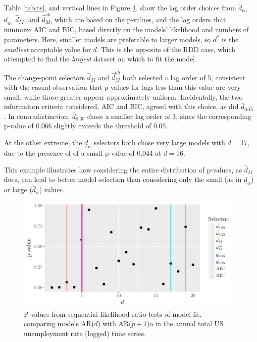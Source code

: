 \documentclass[12pt]{article}\usepackage[]{graphicx}\usepackage[]{color}
\makeatletter
\def\maxwidth{ %
  \ifdim\Gin@nat@width>\linewidth
    \linewidth
  \else
    \Gin@nat@width
  \fi
}
\newcommand{\dalphaU}{\bar{d}_\alpha}
\newcommand{\dalphaB}{\underline{d}_\alpha}
\newcommand{\dstar}{d^*}
\newcommand{\dhatU}{\bar{d}}
\newcommand{\dhatm}{\hat{d}_M}
\newcommand{\dhatmab}{\hat{d}^{ab}_M}
\makeatother
\begin{document}
Table \ref{tab:ts}, and vertical lines in Figure \ref{fig:tspvalues1},
show the lag order choices from $\dalphaU$, $\dalphaB$, $\dhatm$, and
$\dhatmab$, which are based on the p-values, and the lag orders that
minimize AIC and BIC, based directly on the models' likelihood and numbers
of parameters.
Here, smaller models are preferable to larger models, so $\dstar$ is
the \emph{smallest} acceptable value for $d$.
This is the opposite of the RDD case, which attempted to find the
\emph{largest} dataset on which to fit the model.






The change-point selectors $\dhatm$ and $\dhatmab$ both selected a
lag order of 5, consistent with the casual
observation that p-values for lags less than this value are very
small, while those greater appear approximately uniform.
Incidentally, the two information criteria considered, AIC and BIC,
agreed with this choice, as did $\dhatU_{0.15}$.
In contradistinction, $\dhatU_{0.05}$ chose a smaller lag order of
3, since the corresponding p-value of
0.066 slightly exceeds the threshold of 0.05.

At the other extreme, the $\dalphaB$ selectors both chose very large
models with $d=$17, due to the presence of
of a small p-value of
0.044 at
$d=$16.

This example illustrates how considering the entire distribution of
p-values, as $\dhatm$ does, can lead to better model selection than
considering only the small (as in $\dalphaB$) or large ($\dalphaU$)
values.

\begin{figure}

\includegraphics[width=\maxwidth]{figure/tsResults-1} 

\caption{P-values from sequential likelihood-ratio tests of model fit,
  comparing models AR($d$) with AR($p+1$)o in the annual total US
  unemployment rate (logged) time series.}
\label{fig:tspvalues1}
\end{figure}
\end{document}
